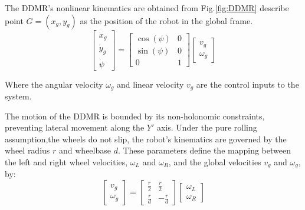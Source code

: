     The DDMR's nonlinear kinematics are obtained from Fig.\ref{fig:DDMR} describe point $G=(x_g,y_g)$ as the position of 
    the robot in the global frame.
    \begin{equation}
        \begin{bmatrix}
            \dot x_g \\
            \dot y_g \\
            \dot \psi
        \end{bmatrix}
        =
        \begin{bmatrix}
            \cos(\psi) & 0 \\
            \sin(\psi) & 0 \\
            0 & 1
        \end{bmatrix}
        \begin{bmatrix}
            v_g \\
            \omega_g
        \end{bmatrix}
        \label{eq:DDMRGlobal}
    \end{equation}

    Where the angular velocity $\omega_g$ and linear velocity $v_g$ are the control 
    inputs to the system. 

    The motion of the DDMR is bounded by its non-holonomic constraints, 
    preventing lateral movement along the $Y'$ axis. 
    Under the pure rolling assumption,the wheels do not slip, the robot's kinematics 
    are governed by the wheel radius $r$ and wheelbase $d$. These parameters define 
    the mapping between the left and right wheel velocities, $\omega_L$ and $\omega_R$, 
    and the global velocities $v_g$ and $\omega_g$, by:
    \begin{equation}
        \begin{bmatrix}
            v_g \\
            \omega_g
        \end{bmatrix}
        =
        \begin{bmatrix}
            \frac{r}{2} & \frac{r}{2} \\
            \frac{r}{d} & -\frac{r}{d}
        \end{bmatrix}
        \begin{bmatrix}
            \omega_L \\
            \omega_R
        \end{bmatrix}
        \label{eq:DDMR}
    \end{equation}

    
